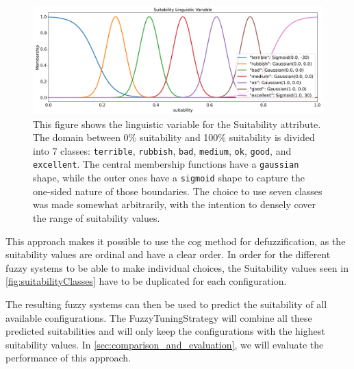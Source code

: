 \begin{figure}[H]
    \centering
    \includegraphics[width=\columnwidth,trim={0cm 0 0cm 0cm},clip]{figures/ProofOfConcepts/suitability_membership_functions.png}
    \caption[Linguistic variable for the Suitability attribute]{
        This figure shows the linguistic variable for the Suitability attribute. The domain between 0\% suitability and 100\% suitability is divided into 7 classes: \texttt{terrible}, \texttt{rubbish}, \texttt{bad}, \texttt{medium}, \texttt{ok}, \texttt{good}, and \texttt{excellent}. The central membership functions have a \texttt{gaussian} shape, while the outer ones have a \texttt{sigmoid} shape to capture the one-sided nature of those boundaries. The choice to use seven classes was made somewhat arbitrarily, with the intention to densely cover the range of suitability values.
    }
    \label{fig:suitabilityClasses}
\end{figure}

This approach makes it possible to use the \gls{cog} method for defuzzification, as the suitability values are ordinal and have a clear order. In order for the different fuzzy systems to be able to make individual choices, the Suitability values seen in \autoref{fig:suitabilityClasses} have to be duplicated for each configuration.

The resulting fuzzy systems can then be used to predict the suitability of all available configurations. The FuzzyTuningStrategy will combine all these predicted suitabilities and will only keep the configurations with the highest suitability values. In \autoref{sec:comparison_and_evaluation}, we will evaluate the performance of this approach.

\newpage



